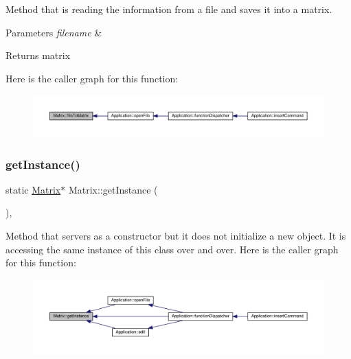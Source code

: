 Method that is reading the information from a file and saves it into a matrix. 
\begin{DoxyParams}{Parameters}
{\em filename} & \\
\hline
\end{DoxyParams}
\begin{DoxyReturn}{Returns}
matrix 
\end{DoxyReturn}
Here is the caller graph for this function\+:
\nopagebreak
\begin{figure}[H]
\begin{center}
\leavevmode
\includegraphics[width=350pt]{class_matrix_a35eb9dcb01c552fea1f5926db35339ef_icgraph}
\end{center}
\end{figure}
\mbox{\label{class_matrix_a0c8e09a50ddb4d068d39456ea130abcc}} 
\subsubsection{\texorpdfstring{get\+Instance()}{getInstance()}}
{\footnotesize\ttfamily static \hyperlink{class_matrix}{Matrix}$\ast$ Matrix\+::get\+Instance (\begin{DoxyParamCaption}{ }\end{DoxyParamCaption})\hspace{0.3cm}{\ttfamily [inline]}, {\ttfamily [static]}}

Method that servers as a constructor but it does not initialize a new object. It is accessing the same instance of this class over and over. Here is the caller graph for this function\+:
\nopagebreak
\begin{figure}[H]
\begin{center}
\leavevmode
\includegraphics[width=350pt]{class_matrix_a0c8e09a50ddb4d068d39456ea130abcc_icgraph}
\end{center}
\end{figure}
\mbox{\label{class_matrix_a52d82641f52304c9b6525747cd7f960c}} 
